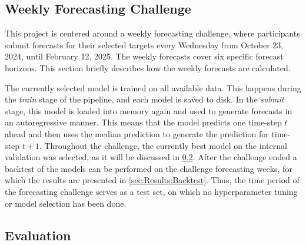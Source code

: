 \subsection{Weekly Forecasting Challenge}
\label{sec:Methodology:ForecastingChallenge}

This project is centered around a weekly forecasting challenge, where participants submit
forecasts for their selected targets every Wednesday from October 23, 2024, until February 12, 2025. The weekly forecasts cover six specific forecast horizons. This section briefly describes how the weekly forecasts are calculated.

The currently selected model is trained on all available data. This happens during the \textit{train} stage of the pipeline, and each model is saved to disk. In the \textit{submit} stage, this model is loaded into memory again and used to generate forecasts in an autoregressive manner. This means that the model predicts one time-step $t$ ahead and then uses the median prediction to generate the prediction for time-step $t+1$. Throughout the challenge, the currently best model on the internal validation was selected, as it will be discussed in \cref{sec:Methodology:Evaluation}. After the challenge ended a backtest of the models can be performed on the challenge forecasting weeks, for which the results are presented in \cref{sec:Results:Backtest}. Thus, the time period of the forecasting challenge serves as a test set, on which no hyperparameter tuning or model selection has been done.

\subsection{Evaluation}
\label{sec:Methodology:Evaluation}

